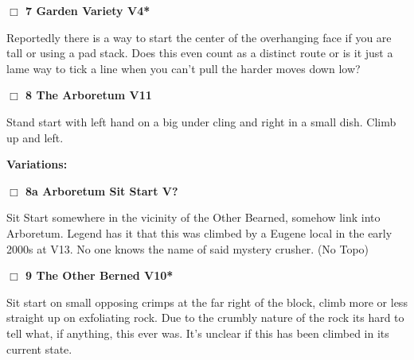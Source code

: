 	\begin{multicols}{2}

\needspace{2em}
\label{rt:Garden Variety}
\colorbox{RoyalBlue!20}{
\parbox{0.95\linewidth}{
\hspace{-1ex}\textbf{$\Box$
7 Garden Variety V4*  
}}}
\begin{adjustwidth}{1.3em}{}			

Reportedly there is a way to start the center of the overhanging face if you are tall or using a pad stack. Does this even count as a distinct route or is it just a lame way to tick a line when you can't pull the harder moves down low?
\end{adjustwidth}




\needspace{2em}
\label{rt:The Arboretum}
\colorbox{red!20}{
\parbox{0.95\linewidth}{
\hspace{-1ex}\textbf{$\Box$
8 The Arboretum V11  
}}}
\begin{adjustwidth}{1.3em}{}			

Stand start with left hand on a big under cling and right in a small dish. Climb up and left.
\end{adjustwidth}


\begin{adjustwidth}{0.5cm}{}				
\needspace{4em}
\textbf{Variations:} \newline

\needspace{2em}
\label{vr:Arboretum Sit Start}
\colorbox{black!20}{
\parbox{0.95\linewidth}{
\hspace{-1ex}\textbf{$\Box$
8a Arboretum Sit Start V?  
}}}
\begin{adjustwidth}{1.3em}{}			

Sit Start somewhere in the vicinity of the Other Bearned, somehow link into Arboretum. Legend has it that this was climbed by a Eugene local in the early 2000s at V13. No one knows the name of said mystery crusher.
  (No Topo)
\end{adjustwidth}



\end{adjustwidth}


\needspace{2em}
\label{rt:The Other Berned}
\colorbox{red!20}{
\parbox{0.95\linewidth}{
\hspace{-1ex}\textbf{$\Box$
9 The Other Berned V10*  
}}}
\begin{adjustwidth}{1.3em}{}			

Sit start on small opposing crimps at the far right of the block, climb more or less straight up on exfoliating rock. Due to the crumbly nature of the rock its hard to tell what, if anything, this ever was. It's unclear if this has been climbed in its current state.
\end{adjustwidth}




	\end{multicols}
